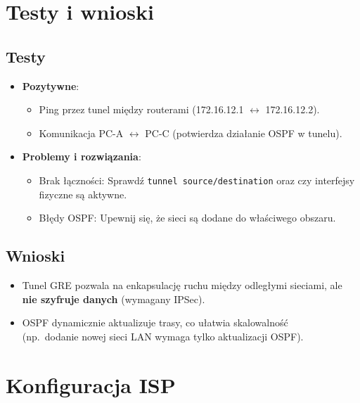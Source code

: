 \documentclass[12pt,twoside,a4paper,openany]{article}
\begin{document}
\section{Testy i wnioski}

\subsection{Testy}

\begin{itemize}    \item \textbf{Pozytywne}:
    \begin{itemize}
        \item Ping przez tunel między routerami (172.16.12.1 $\leftrightarrow$ 172.16.12.2).
        \item Komunikacja PC-A $\leftrightarrow$ PC-C (potwierdza działanie OSPF w tunelu).
    \end{itemize}
    \item \textbf{Problemy i rozwiązania}:
    \begin{itemize}        \item Brak łączności: Sprawdź \texttt{tunnel source/destination} oraz czy interfejsy fizyczne są aktywne.
        \item Błędy OSPF: Upewnij się, że sieci są dodane do właściwego obszaru.
    \end{itemize}
\end{itemize}

\subsection{Wnioski}
\begin{itemize}
    \item Tunel GRE pozwala na enkapsulację ruchu między odległymi sieciami, ale \textbf{nie szyfruje danych} (wymagany IPSec).
    \item OSPF dynamicznie aktualizuje trasy, co ułatwia skalowalność\\ (np.\ dodanie nowej sieci LAN wymaga tylko aktualizacji OSPF).
\end{itemize}

\section{Konfiguracja ISP}
\end{document}
